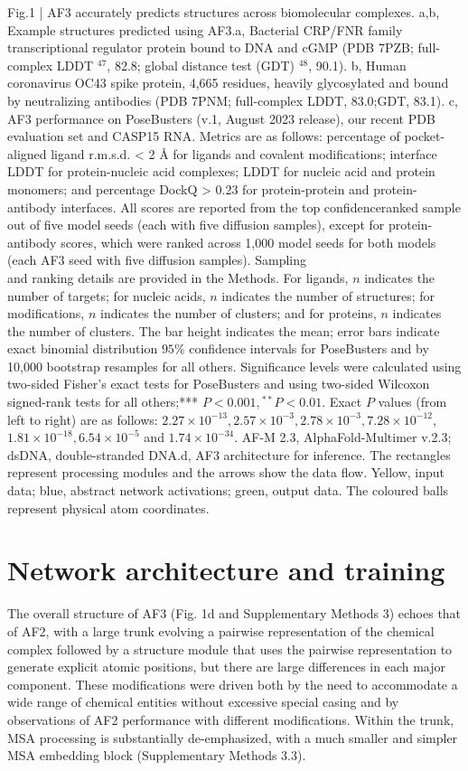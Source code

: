 \documentclass[10pt]{article}
\begin{document}
Fig.1 | AF3 accurately predicts structures across biomolecular complexes. a,b, Example structures predicted using AF3.a, Bacterial CRP/FNR family transcriptional regulator protein bound to DNA and cGMP (PDB 7PZB; full-complex LDDT $^{47}$, 82.8; global distance test (GDT) ${ }^{48}$, 90.1). b, Human coronavirus OC43 spike protein, 4,665 residues, heavily glycosylated and bound by neutralizing antibodies (PDB 7PNM; full-complex LDDT, 83.0;GDT, 83.1). c, AF3 performance on PoseBusters (v.1, August 2023 release), our recent PDB evaluation set and CASP15 RNA. Metrics are as follows: percentage of pocket-aligned ligand r.m.s.d. < 2 Å for ligands and covalent modifications; interface LDDT for protein-nucleic acid complexes; LDDT for nucleic acid and protein monomers; and percentage DockQ > 0.23 for protein-protein and protein-antibody interfaces. All scores are reported from the top confidenceranked sample out of five model seeds (each with five diffusion samples), except for protein-antibody scores, which were ranked across 1,000 model seeds for both models (each AF3 seed with five diffusion samples). Sampling\\
and ranking details are provided in the Methods. For ligands, $n$ indicates the number of targets; for nucleic acids, $n$ indicates the number of structures; for modifications, $n$ indicates the number of clusters; and for proteins, $n$ indicates the number of clusters. The bar height indicates the mean; error bars indicate exact binomial distribution $95 \%$ confidence intervals for PoseBusters and by 10,000 bootstrap resamples for all others. Significance levels were calculated using two-sided Fisher's exact tests for PoseBusters and using two-sided Wilcoxon signed-rank tests for all others;*** $P<0.001,{ }^{* *} P<0.01$. Exact $P$ values (from left to right) are as follows: $2.27 \times 10^{-13}, 2.57 \times 10^{-3}, 2.78 \times 10^{-3}, 7.28 \times 10^{-12}$, $1.81 \times 10^{-18}, 6.54 \times 10^{-5}$ and $1.74 \times 10^{-34}$. AF-M 2.3, AlphaFold-Multimer v.2.3; dsDNA, double-stranded DNA.d, AF3 architecture for inference. The rectangles represent processing modules and the arrows show the data flow. Yellow, input data; blue, abstract network activations; green, output data. The coloured balls represent physical atom coordinates.

\section*{Network architecture and training}
The overall structure of AF3 (Fig. 1d and Supplementary Methods 3) echoes that of AF2, with a large trunk evolving a pairwise representation of the chemical complex followed by a structure module that uses the pairwise representation to generate explicit atomic positions, but there are large differences in each major component. These modifications were driven both by the need to accommodate a wide range of chemical entities without excessive special casing and by observations of AF2 performance with different modifications. Within the trunk, MSA processing is substantially de-emphasized, with a much smaller and simpler MSA embedding block (Supplementary Methods 3.3).
\end{document}
